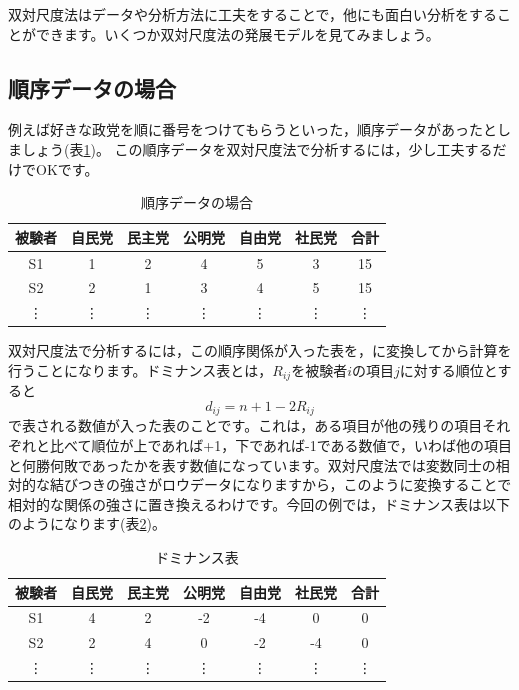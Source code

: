 \documentclass{ltjsbook}
\begin{document}
双対尺度法はデータや分析方法に工夫をすることで，他にも面白い分析をすることができます。いくつか双対尺度法の発展モデルを見てみましょう。
\subsection{順序データの場合}
例えば好きな政党を順に番号をつけてもらうといった，順序データがあったとしましょう(表\ref{jun})。
この順序データを双対尺度法で分析するには，少し工夫するだけでOKです。
\begin{table}[ht]
	\begin{center}
		\caption{順序データの場合}
		\begin{tabular}{c|ccccc|c}
			被験者    & 自民党    & 民主党    & 公明党    & 自由党    & 社民党    & 合計     \\
			\hline
			S1     & 1      & 2      & 4      & 5      & 3      & 15     \\
			S2     & 2      & 1      & 3      & 4      & 5      & 15     \\
			\vdots & \vdots & \vdots & \vdots & \vdots & \vdots & \vdots \\
		\end{tabular}
		\label{jun}
	\end{center}
\end{table}

双対尺度法で分析するには，この順序関係が入った表を，に変換してから計算を行うことになります。ドミナンス表とは，$R_{ij}$を被験者$i$の項目$j$に対する順位とすると
\begin{equation}
	d_{ij}=n+1-2R_{ij}
\end{equation}
で表される数値が入った表のことです。これは，ある項目が他の残りの項目それぞれと比べて順位が上であれば+1，下であれば-1である数値で，いわば他の項目と何勝何敗であったかを表す数値になっています。双対尺度法では変数同士の相対的な結びつきの強さがロウデータになりますから，このように変換することで相対的な関係の強さに置き換えるわけです。今回の例では，ドミナンス表は以下のようになります(表\ref{dominance})。
\begin{table}[ht]
	\begin{center}
		\caption{ドミナンス表}
		\begin{tabular}{c|ccccc|c}
			被験者    & 自民党    & 民主党    & 公明党    & 自由党    & 社民党    & 合計     \\
			\hline
			S1     & 4      & 2      & -2     & -4     & 0      & 0      \\
			S2     & 2      & 4      & 0      & -2     & -4     & 0      \\
			\vdots & \vdots & \vdots & \vdots & \vdots & \vdots & \vdots \\
		\end{tabular}
		\label{dominance}
	\end{center}
\end{table}
\end{document}
